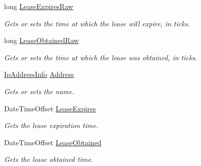 \begin{DoxyCompactItemize}
\item 
long \hyperlink{class_microsoft_1_1_tools_1_1_windows_device_portal_1_1_device_portal_1_1_dhcp_aef1d7eeefa8c3aa129d17f713e2187d3}{Lease\+Expires\+Raw}
\begin{DoxyCompactList}\small\item\em Gets or sets the time at which the lease will expire, in ticks. \end{DoxyCompactList}\item 
long \hyperlink{class_microsoft_1_1_tools_1_1_windows_device_portal_1_1_device_portal_1_1_dhcp_ab3fec7067df816e3d7fc7d2a2023e0d9}{Lease\+Obtained\+Raw}
\begin{DoxyCompactList}\small\item\em Gets or sets the time at which the lease was obtained, in ticks. \end{DoxyCompactList}\item 
\hyperlink{class_microsoft_1_1_tools_1_1_windows_device_portal_1_1_device_portal_1_1_ip_address_info}{Ip\+Address\+Info} \hyperlink{class_microsoft_1_1_tools_1_1_windows_device_portal_1_1_device_portal_1_1_dhcp_aa5e63ada47663d34691cb7f55de2c560}{Address}
\begin{DoxyCompactList}\small\item\em Gets or sets the name. \end{DoxyCompactList}\item 
Date\+Time\+Offset \hyperlink{class_microsoft_1_1_tools_1_1_windows_device_portal_1_1_device_portal_1_1_dhcp_a84d6eda2fc60bc70160fdb43b18988b2}{Lease\+Expires}
\begin{DoxyCompactList}\small\item\em Gets the lease expiration time. \end{DoxyCompactList}\item 
Date\+Time\+Offset \hyperlink{class_microsoft_1_1_tools_1_1_windows_device_portal_1_1_device_portal_1_1_dhcp_ad8e0c9e2915d9a544fb3916bffc26dae}{Lease\+Obtained}
\begin{DoxyCompactList}\small\item\em Gets the lease obtained time. \end{DoxyCompactList}\end{DoxyCompactItemize}


